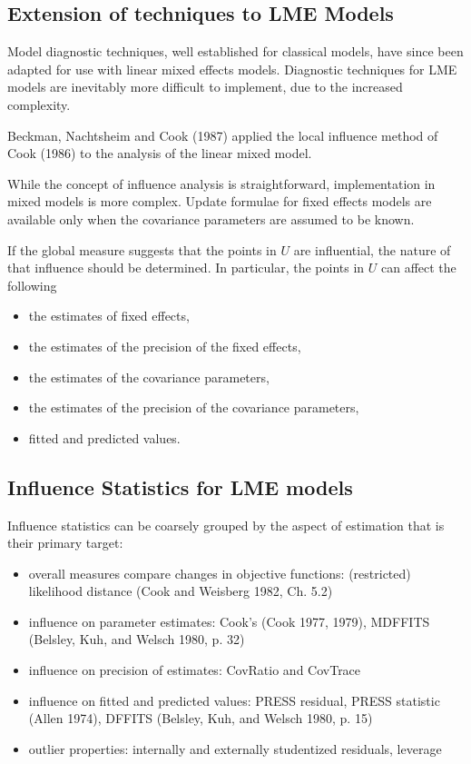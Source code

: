 \documentclass[12pt, a4paper]{article}
\begin{document}
\newpage
\subsection{Extension of techniques to LME Models} %

Model diagnostic techniques, well established for classical models, have since been adapted for use with linear mixed effects models. Diagnostic techniques for LME models are inevitably more difficult to implement, due to the increased complexity.

Beckman, Nachtsheim and Cook (1987) \citet{Beckman} applied the local influence method of Cook (1986) to the analysis of the linear mixed model.

While the concept of influence analysis is straightforward, implementation in mixed models is more complex. Update formulae for fixed effects models are available only when the covariance parameters are assumed to be known.

If the global measure suggests that the points in $U$ are influential, the nature of that influence should be determined. In particular, the points in $U$ can affect the following

\begin{itemize}
	\item the estimates of fixed effects,
	\item the estimates of the precision of the fixed effects,
	\item the estimates of the covariance parameters,
	\item the estimates of the precision of the covariance parameters,
	\item fitted and predicted values.
\end{itemize}






\newpage
\subsection{Influence Statistics for LME models} %
Influence statistics can be coarsely grouped by the aspect of estimation that is their primary target:
\begin{itemize}
	\item overall measures compare changes in objective functions: (restricted) likelihood distance (Cook and Weisberg 1982, Ch. 5.2)
	\item influence on parameter estimates: Cook's  (Cook 1977, 1979), MDFFITS (Belsley, Kuh, and Welsch 1980, p. 32)
	\item influence on precision of estimates: CovRatio and CovTrace
	\item influence on fitted and predicted values: PRESS residual, PRESS statistic (Allen 1974), DFFITS (Belsley, Kuh, and Welsch 1980, p. 15)
	\item outlier properties: internally and externally studentized residuals, leverage
\end{itemize}
\end{document}

